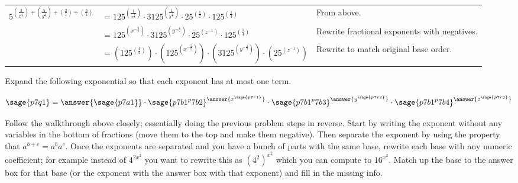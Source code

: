 \documentclass{ximera}
\begin{document}
\begin{example}
\renewcommand{\arraystretch}{2.5}
\noindent\begin{tabular}{rll}
    $5^{
        \left(\frac{3}{x^{\frac{2}{9}}}\right) + \left( \frac{5}{y^{\frac{4}{9}}} \right) + \left( \frac{2}{z} \right) + \left(\frac{3}{4}\right)
    }$
    & $= 125^{\left(\frac{1}{x^{\frac{2}{9}}}\right)}\cdot 
        3125^{\left(\frac{1}{y^{\frac{4}{9}}}\right)} \cdot 
        25^{\left(\frac{1}{z}\right)} \cdot 
        125^{\left(\frac{1}{4}\right)}$
    & From above.\\
    & $= 125^{\left(x^{-\frac{2}{9}}\right)}\cdot 
        3125^{\left(y^{-\frac{4}{9}}\right)}\cdot 
        25^{\left(z^{-1}\right)}\cdot 
        125^{\left(\frac{1}{4}\right)}$
    & Rewrite fractional exponents with negatives.\\
    & $= \left(125^{\left(\frac{1}{4}\right)}\right)\cdot
        \left(125^{\left(x^{-\frac{2}{9}}\right)}\right)\cdot
        \left(3125^{\left(y^{-\frac{4}{9}}\right)}\right)\cdot
        \left(25^{\left(z^{-1}\right)}\right)$
    & Rewrite to match original base order.
\end{tabular}
\renewcommand{\arraystretch}{1}
\end{example}


\begin{problem}
    Expand the following exponential so that each exponent has at most one term.
    
    \[
        \sage{p7q1} 
            = \answer{\sage{p7a1}} \cdot {\sage{p7b1^p7b2}}^{\answer{x^{\sage{p7r1}}}} \cdot  {\sage{p7b1^p7b3}}^{\answer{y^{\sage{p7r2}}}} \cdot {\sage{p7b1^p7b4}}^{\answer{z^{\sage{p7r3}}}}
    \]
    \begin{feedback}
        Follow the walkthrough above closely; essentially doing the previous problem steps in reverse. Start by writing the exponent without any variables in the bottom of fractions (move them to the top and make them negative). Then separate the exponent by using the property that $a^{b+c} = a^ba^c$. Once the exponents are separated and you have a bunch of parts with the same base, rewrite each base with any numeric coefficient; for example instead of $4^{2x^2}$ you want to rewrite this as $\left(4^2\right)^{x^2}$ which you can compute to $16^{x^2}$. Match up the base to the answer box for that base (or the exponent with the answer box with that exponent) and fill in the missing info.
    \end{feedback}
\end{problem}
\end{document}
